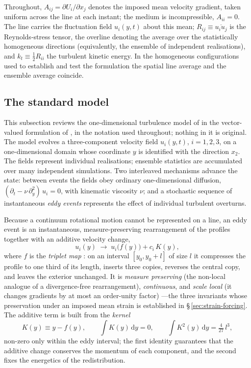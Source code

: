 \documentclass[11pt,a4paper]{article}
\begin{document}
Throughout, $A_{ij}=\partial U_i/\partial x_j$ denotes the imposed mean
velocity gradient, taken uniform across the line at each instant; the
medium is incompressible, $A_{ii}=0$. The line carries the fluctuation
field $u_i(y,t)$ about this mean; $R_{ij}\equiv\overline{u_iu_j}$ is the
Reynolds-stress tensor, the overline denoting the average over the
statistically homogeneous directions (equivalently, the ensemble of
independent realisations), and $k_t\equiv\tfrac12R_{ii}$ the turbulent
kinetic energy. In the homogeneous configurations used to establish and
test the formulation the spatial line average and the ensemble average
coincide.

\subsection{The standard model}\label{sec:odt-review}

This subsection reviews the one-dimensional turbulence model of
\citet{Kerstein1999} in the vector-valued formulation of
\citet{Kerstein2001}, in the notation used throughout; nothing in it is
original. The model evolves a three-component velocity field $u_i(y,t)$,
$i=1,2,3$, on a one-dimensional domain whose coordinate $y$ is identified
with the direction $x_2$. The fields represent individual realisations;
ensemble statistics are accumulated over many independent simulations.
Two interleaved mechanisms advance the state: between events the fields
obey ordinary one-dimensional diffusion,
$(\partial_t-\nu\,\partial_y^2)\,u_i=0$, with kinematic viscosity $\nu$;
and a stochastic sequence of instantaneous \emph{eddy events} represents
the effect of individual turbulent overturns.

Because a continuum rotational motion cannot be represented on a line, an
eddy event is an instantaneous, measure-preserving rearrangement of the
profiles together with an additive velocity change,
\begin{equation}
  u_i(y)\;\longrightarrow\;u_i\!\big(f(y)\big)+c_i\,K(y),
  \label{eq:event}
\end{equation}
where $f$ is the \emph{triplet map}
\citep{Kerstein1991,Kerstein1999}: on an interval $[y_0,y_0+l]$ of size
$l$ it compresses the profile to one third of its length, inserts three
copies, reverses the central copy, and leaves the exterior unchanged.
It is \emph{measure preserving} (the non-local analogue of a
divergence-free rearrangement), \emph{continuous}, and \emph{scale
local} (it changes gradients by at most an order-unity factor)
\citep{Kerstein2001}---the
three invariants whose preservation under an imposed mean strain is
established in \S\,\ref{sec:strain-forcing}. The additive term is built
from the \emph{kernel}
\begin{equation}
  K(y)\equiv y-f(y),
  \qquad
  \int K(y)\,\mathrm{d}y = 0,
  \qquad
  \int K^2(y)\,\mathrm{d}y = \tfrac{4}{27}\,l^{3},
  \label{eq:kernel-identities}
\end{equation}
non-zero only within the eddy interval; the first identity guarantees
that the additive change conserves the momentum of each component, and
the second fixes the energetics of the redistribution.
\end{document}
